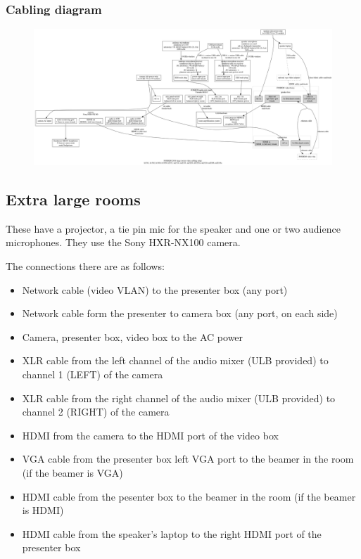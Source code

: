 \documentclass{article}
\begin{document}
\subsubsection{Cabling diagram}
\begin{figure}[H]
  \begin{sideways}
  \centering
  \includegraphics[width = 200mm]{../../graph/cabling_large_rooms.png}
  \end{sideways}
\end{figure}

\subsection{Extra large rooms}
These have a projector, a tie pin mic for the speaker and one or two audience microphones. They use the Sony HXR-NX100 camera. 

The connections there are as follows:

\begin{itemize}
  \item Network cable (video VLAN) to the presenter box (any port)
  \item Network cable form the presenter to camera box (any port, on each side)
  \item Camera, presenter box, video box to the AC power
  \item XLR cable from the left channel of the audio mixer (ULB provided) to channel 1 (LEFT) of the camera
  \item XLR cable from the right channel of the audio mixer (ULB provided) to channel 2 (RIGHT) of the camera
  \item HDMI from the camera to the HDMI port of the video box
  \item VGA cable from the presenter box left VGA port to the beamer in the room (if the beamer is VGA)
  \item HDMI cable from the pesenter box to the beamer in the room (if the beamer is HDMI)
  \item HDMI cable from the speaker's laptop to the right HDMI port of the presenter box
\end{itemize}
\end{document}
